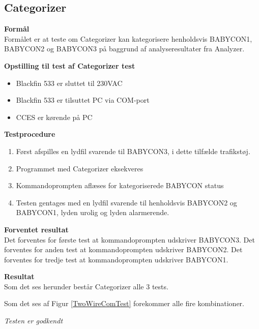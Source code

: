 \subsection*{Categorizer}

\textbf{Formål} \\
Formålet er at teste om Categorizer kan kategorisere henholdsvis BABYCON1, BABYCON2 og BABYCON3 på baggrund af analyseresultater fra Analyzer.

\textbf{Opstilling til test af Categorizer test}

\begin{itemize}
	\item Blackfin 533 er sluttet til 230VAC
	\item Blackfin 533 er tilsuttet PC via COM-port
	\item CCES er kørende på PC
\end{itemize}

\textbf{Testprocedure}
\begin{enumerate}
	\item Først afspilles en lydfil svarende til BABYCON3, i dette tilfælde trafikstøj.
	\item Programmet med Categorizer eksekveres 
	\item Kommandoprompten aflæses for kategoriserede BABYCON status
	\item Testen gentages med en lydfil svarende til henholdsvis BABYCON2 og BABYCON1, lyden urolig og lyden alarmerende. 
\end{enumerate}

\textbf{Forventet resultat} \\
Det forventes for første test at kommandoprompten udskriver BABYCON3.
Det forventes for anden test at kommandoprompten udskriver BABYCON2.
Det forventes for tredje test at kommandoprompten udskriver BABYCON1. 

\textbf{Resultat} \\
Som det ses herunder består Categorizer alle 3 tests. 


Som det ses af Figur \ref{TwoWireComTest} forekommer alle fire kombinationer. \\



\textit{Testen er godkendt}